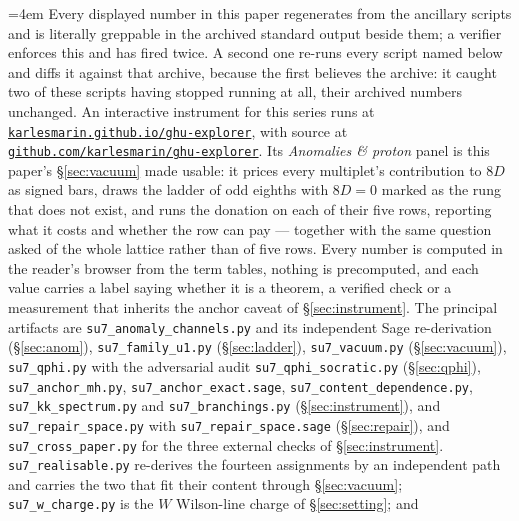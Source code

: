 \documentclass[11pt,a4paper]{article}
\begin{document}
\begingroup\raggedright\sloppy\emergencystretch=4em
Every displayed number in this paper regenerates from the ancillary scripts and is literally
greppable in the archived standard output beside them; a verifier enforces this and has fired twice.
A second one re-runs every script named below and diffs it against that archive, because the first
believes the archive: it caught two of these scripts having stopped running at all, their archived
numbers unchanged.
An interactive instrument for this series runs at
\href{https://karlesmarin.github.io/ghu-explorer/}{\texttt{karlesmarin.github.io/ghu-explorer}},
with source at \href{https://github.com/karlesmarin/ghu-explorer}{\texttt{github.com/karlesmarin/ghu-explorer}}. Its \emph{Anomalies \& proton} panel is this paper's
\S\ref{sec:vacuum} made usable: it prices every multiplet's contribution to $8D$ as signed bars,
draws the ladder of odd eighths with $8D=0$ marked as the rung that does not exist, and runs the
donation on each of their five rows, reporting what it costs and whether the row can pay ---
together with the same question asked of the whole lattice rather than of five rows. Every
number is computed in the reader's browser from the term tables, nothing is precomputed, and
each value carries a label saying whether it is a theorem, a verified check or a measurement
that inherits the anchor caveat of \S\ref{sec:instrument}.
The principal artifacts are \texttt{su7\_\allowbreak anomaly\_\allowbreak channels.py} and its independent Sage
re-derivation (\S\ref{sec:anom}), \texttt{su7\_\allowbreak family\_\allowbreak u1.py} (\S\ref{sec:ladder}),
\texttt{su7\_\allowbreak vacuum.py} (\S\ref{sec:vacuum}), \texttt{su7\_\allowbreak qphi.py} with the adversarial audit
\texttt{su7\_\allowbreak qphi\_\allowbreak socratic.py} (\S\ref{sec:qphi}), \texttt{su7\_\allowbreak anchor\_\allowbreak mh.py},
\texttt{su7\_\allowbreak anchor\_\allowbreak exact.sage}, \texttt{su7\_\allowbreak content\_\allowbreak dependence.py},
\texttt{su7\_\allowbreak kk\_\allowbreak spectrum.py} and \texttt{su7\_\allowbreak branchings.py} (\S\ref{sec:instrument}), and
\texttt{su7\_\allowbreak repair\_\allowbreak space.py} with \texttt{su7\_\allowbreak repair\_\allowbreak space.\allowbreak sage} (\S\ref{sec:repair}), and
\texttt{su7\_\allowbreak cross\_\allowbreak paper.py} for the three external checks of \S\ref{sec:instrument}.
\texttt{su7\_\allowbreak realisable.py} re-derives the fourteen assignments by an independent path and
carries the two that fit their content through \S\ref{sec:vacuum};
\texttt{su7\_\allowbreak w\_\allowbreak charge.py} is the $W$ Wilson-line charge of \S\ref{sec:setting}; and
\end{document}
